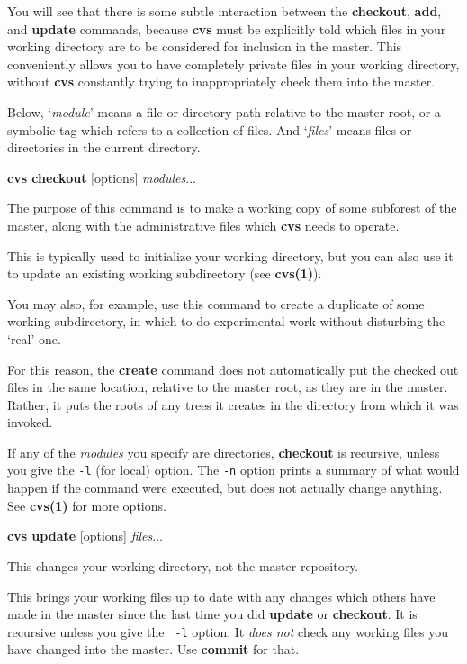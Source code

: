 You will see that there is some subtle interaction between the {\bf
checkout}, {\bf add}, and {\bf update} commands, because {\bf cvs}
must be explicitly told which files in your working directory are to
be considered for inclusion in the master. This conveniently allows
you to have completely private files in your working directory,
without {\bf cvs} constantly trying to inappropriately check them into
the master.

Below, `{\em module}' means a file or directory path relative to the
master root, or a symbolic tag which refers to a collection of files.
And `{\em files}' means files or directories in the current directory.

\begin{description}

\item{{\bf cvs checkout} [options] {\em modules}...}

The purpose of this command is to make a working copy of some
subforest of the master, along with the administrative files which
{\bf cvs} needs to operate.

This is typically used to initialize your working directory, but you
can also use it to update an existing working subdirectory (see {\bf
cvs(1)}).

You may also, for example, use this command to create a duplicate of
some working subdirectory, in which to do experimental work without
disturbing the `real' one.

For this reason, the {\bf create} command does not automatically put
the checked out files in the same location, relative to the master
root, as they are in the master. Rather, it puts the roots of any
trees it creates in the directory from which it was invoked.

If any of the {\em modules} you specify are directories, {\bf
checkout} is recursive, unless you give the {\tt -l} (for local)
option. The {\tt -n} option prints a summary of what would happen if
the command were executed, but does not actually change anything. See
{\bf cvs(1)} for more options.



\item{{\bf cvs update} [options] {\em files}...}

This changes your working directory, not the master repository.

This brings your working files up to date with any changes which
others have made in the master since the last time you did {\bf
update} or {\bf checkout}. It is recursive unless you give the {\tt
-l} option. It {\em does not} check any working files you have changed
into the master. Use {\bf commit} for that.


\end{description}
